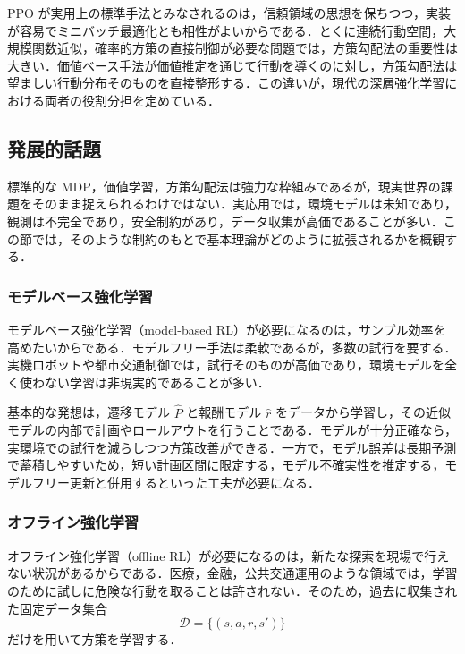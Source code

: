 PPO が実用上の標準手法とみなされるのは，信頼領域の思想を保ちつつ，実装が容易でミニバッチ最適化とも相性がよいからである．とくに連続行動空間，大規模関数近似，確率的方策の直接制御が必要な問題では，方策勾配法の重要性は大きい．価値ベース手法が価値推定を通じて行動を導くのに対し，方策勾配法は望ましい行動分布そのものを直接整形する．この違いが，現代の深層強化学習における両者の役割分担を定めている．

\subsection{発展的話題}

標準的な MDP，価値学習，方策勾配法は強力な枠組みであるが，現実世界の課題をそのまま捉えられるわけではない．実応用では，環境モデルは未知であり，観測は不完全であり，安全制約があり，データ収集が高価であることが多い．この節では，そのような制約のもとで基本理論がどのように拡張されるかを概観する．

\subsubsection{モデルベース強化学習}

モデルベース強化学習（model-based RL）が必要になるのは，サンプル効率を高めたいからである．モデルフリー手法は柔軟であるが，多数の試行を要する．実機ロボットや都市交通制御では，試行そのものが高価であり，環境モデルを全く使わない学習は非現実的であることが多い．

基本的な発想は，遷移モデル $\hat{P}$ と報酬モデル $\hat{r}$ をデータから学習し，その近似モデルの内部で計画やロールアウトを行うことである．モデルが十分正確なら，実環境での試行を減らしつつ方策改善ができる．一方で，モデル誤差は長期予測で蓄積しやすいため，短い計画区間に限定する，モデル不確実性を推定する，モデルフリー更新と併用するといった工夫が必要になる．

\subsubsection{オフライン強化学習}

オフライン強化学習（offline RL）が必要になるのは，新たな探索を現場で行えない状況があるからである．医療，金融，公共交通運用のような領域では，学習のために試しに危険な行動を取ることは許されない．そのため，過去に収集された固定データ集合
\begin{equation*}
\mathcal{D} = \{(s,a,r,s')\}
\end{equation*}
だけを用いて方策を学習する．

